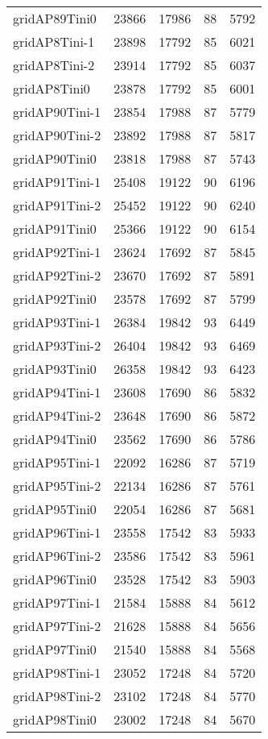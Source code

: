 \begin{tabular}{lrrrr}
gridAP89Tini0 & 23866 & 17986 & 88 & 5792 \\
gridAP8Tini-1 & 23898 & 17792 & 85 & 6021 \\
gridAP8Tini-2 & 23914 & 17792 & 85 & 6037 \\
gridAP8Tini0 & 23878 & 17792 & 85 & 6001 \\
gridAP90Tini-1 & 23854 & 17988 & 87 & 5779 \\
gridAP90Tini-2 & 23892 & 17988 & 87 & 5817 \\
gridAP90Tini0 & 23818 & 17988 & 87 & 5743 \\
gridAP91Tini-1 & 25408 & 19122 & 90 & 6196 \\
gridAP91Tini-2 & 25452 & 19122 & 90 & 6240 \\
gridAP91Tini0 & 25366 & 19122 & 90 & 6154 \\
gridAP92Tini-1 & 23624 & 17692 & 87 & 5845 \\
gridAP92Tini-2 & 23670 & 17692 & 87 & 5891 \\
gridAP92Tini0 & 23578 & 17692 & 87 & 5799 \\
gridAP93Tini-1 & 26384 & 19842 & 93 & 6449 \\
gridAP93Tini-2 & 26404 & 19842 & 93 & 6469 \\
gridAP93Tini0 & 26358 & 19842 & 93 & 6423 \\
gridAP94Tini-1 & 23608 & 17690 & 86 & 5832 \\
gridAP94Tini-2 & 23648 & 17690 & 86 & 5872 \\
gridAP94Tini0 & 23562 & 17690 & 86 & 5786 \\
gridAP95Tini-1 & 22092 & 16286 & 87 & 5719 \\
gridAP95Tini-2 & 22134 & 16286 & 87 & 5761 \\
gridAP95Tini0 & 22054 & 16286 & 87 & 5681 \\
gridAP96Tini-1 & 23558 & 17542 & 83 & 5933 \\
gridAP96Tini-2 & 23586 & 17542 & 83 & 5961 \\
gridAP96Tini0 & 23528 & 17542 & 83 & 5903 \\
gridAP97Tini-1 & 21584 & 15888 & 84 & 5612 \\
gridAP97Tini-2 & 21628 & 15888 & 84 & 5656 \\
gridAP97Tini0 & 21540 & 15888 & 84 & 5568 \\
gridAP98Tini-1 & 23052 & 17248 & 84 & 5720 \\
gridAP98Tini-2 & 23102 & 17248 & 84 & 5770 \\
gridAP98Tini0 & 23002 & 17248 & 84 & 5670 \\

\end{tabular}
